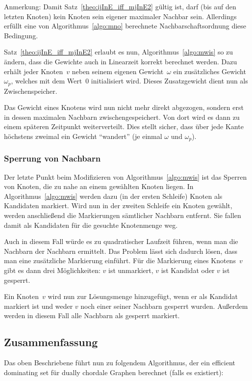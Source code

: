 Anmerkung: Damit Satz~\ref{theo:ijInE_iff_mjInE2} gültig ist, darf (bis auf den letzten Knoten) kein Knoten sein eigener maximaler Nachbar sein. Allerdings erfüllt eine von Algorithmus~\ref{algo:mno} berechnete Nachbarschaftsordnung diese Bedingung.

Satz~\ref{theo:ijInE_iff_mjInE2} erlaubt es nun, Algorithmus~\ref{algo:mwis} so zu ändern, dass die Gewichte auch in Linearzeit korrekt berechnet werden. Dazu erhält jeder Knoten~$v$ neben seinem eigenen Gewicht~$\omega$ ein zusätzliches Gewicht~$\omega_p$, welches mit dem Wert~$0$ initialisiert wird. Dieses Zusatzgewicht dient nun als Zwischenspeicher.

Das Gewicht eines Knotens wird nun nicht mehr direkt abgezogen, sondern erst in dessen maximalen Nachbarn zwischengespeichert. Von dort wird es dann zu einem späteren Zeitpunkt weiterverteilt. Dies stellt sicher, dass über jede Kante höchstens zweimal ein Gewicht "`wandert"' (je einmal $\omega$ und $\omega_p$).

\subsubsection{Sperrung von Nachbarn}
Der letzte Punkt beim Modifizieren von Algorithmus~\ref{algo:mwis} ist das Sperren von Knoten, die zu nahe an einem gewählten Knoten liegen. In Algorithmus~\ref{algo:mwis} werden dazu (in der ersten Schleife) Knoten als Kandidaten markiert. Wird nun in der zweiten Schleife ein Knoten gewählt, werden anschließend die Markierungen sämtlicher Nachbarn entfernt. Sie fallen damit als Kandidaten für die gesuchte Knotenmenge weg.

Auch in diesem Fall würde es zu quadratischer Laufzeit führen, wenn man die Nachbarn der Nachbarn ermittelt. Das Problem lässt sich dadurch lösen, dass man eine zusätzliche Markierung einführt. Für die Markierung eines Knotens~$v$ gibt es dann drei Möglichkeiten: $v$ ist unmarkiert, $v$ ist Kandidat oder $v$ ist gesperrt.

Ein Knoten~$v$ wird nun zur Lösungsmenge hinzugefügt, wenn er als Kandidat markiert ist und weder $v$ noch einer seiner Nachbarn gesperrt wurden. Außerdem werden in diesem Fall alle Nachbarn als gesperrt markiert.

\subsection{Zusammenfassung}
Das oben Beschriebene führt nun zu folgendem Algorithmus, der ein efficient dominating set für dually chordale Graphen berechnet (falls es existiert):

